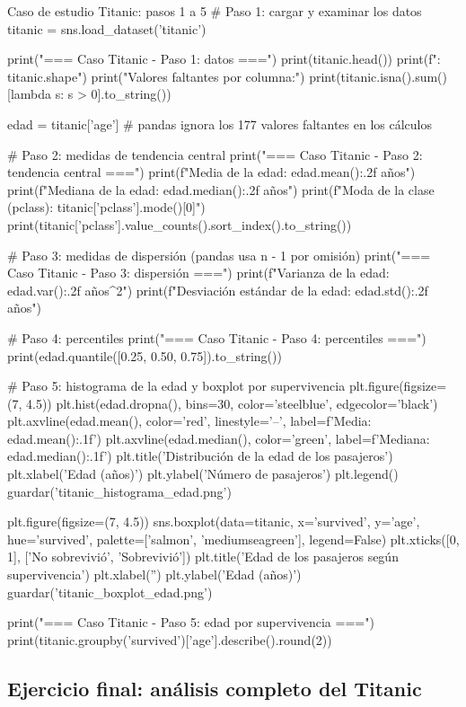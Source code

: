 \documentclass[11pt,letterpaper]{article}
\begin{document}
\begin{codigo}[label=cod:titanic]{Caso de estudio Titanic: pasos 1 a 5}
# Paso 1: cargar y examinar los datos
titanic = sns.load_dataset('titanic')

print("\n=== Caso Titanic - Paso 1: datos ===")
print(titanic.head())
print(f"\nDimensiones: {titanic.shape}")
print("Valores faltantes por columna:")
print(titanic.isna().sum()[lambda s: s > 0].to_string())

edad = titanic['age']  # pandas ignora los 177 valores faltantes en los cálculos

# Paso 2: medidas de tendencia central
print("\n=== Caso Titanic - Paso 2: tendencia central ===")
print(f"Media de la edad: {edad.mean():.2f} años")
print(f"Mediana de la edad: {edad.median():.2f} años")
print(f"Moda de la clase (pclass): {titanic['pclass'].mode()[0]}")
print(titanic['pclass'].value_counts().sort_index().to_string())

# Paso 3: medidas de dispersión (pandas usa n - 1 por omisión)
print("\n=== Caso Titanic - Paso 3: dispersión ===")
print(f"Varianza de la edad: {edad.var():.2f} años^2")
print(f"Desviación estándar de la edad: {edad.std():.2f} años")

# Paso 4: percentiles
print("\n=== Caso Titanic - Paso 4: percentiles ===")
print(edad.quantile([0.25, 0.50, 0.75]).to_string())

# Paso 5: histograma de la edad y boxplot por supervivencia
plt.figure(figsize=(7, 4.5))
plt.hist(edad.dropna(), bins=30, color='steelblue', edgecolor='black')
plt.axvline(edad.mean(), color='red', linestyle='--', label=f'Media: {edad.mean():.1f}')
plt.axvline(edad.median(), color='green', label=f'Mediana: {edad.median():.1f}')
plt.title('Distribución de la edad de los pasajeros')
plt.xlabel('Edad (años)')
plt.ylabel('Número de pasajeros')
plt.legend()
guardar('titanic_histograma_edad.png')

plt.figure(figsize=(7, 4.5))
sns.boxplot(data=titanic, x='survived', y='age', hue='survived',
            palette=['salmon', 'mediumseagreen'], legend=False)
plt.xticks([0, 1], ['No sobrevivió', 'Sobrevivió'])
plt.title('Edad de los pasajeros según supervivencia')
plt.xlabel('')
plt.ylabel('Edad (años)')
guardar('titanic_boxplot_edad.png')

print("\n=== Caso Titanic - Paso 5: edad por supervivencia ===")
print(titanic.groupby('survived')['age'].describe().round(2))
\end{codigo}

\subsection{Ejercicio final: análisis completo del Titanic}
\end{document}
